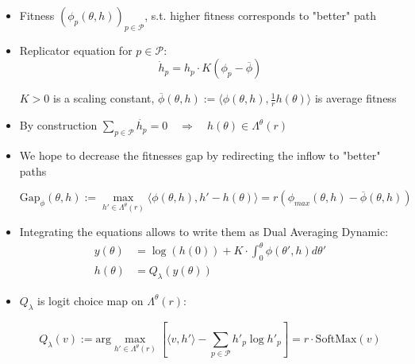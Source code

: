 \documentclass[10pt]{beamer}
\begin{document}
\begin{frame}

\begin{itemize}

\item Fitness  $( \phi_p(\theta, h) )_{p \in \mathcal{P}}$, s.t. higher fitness corresponds to "better" path

\item Replicator equation for $p \in \mathcal{P}$:
$$ \dot{h}_p = h_p \cdot K( \phi_p - \overline{\phi} ) $$

 $K > 0$ is a scaling constant,
 $ \overline{\phi}(\theta, h) := \langle \phi(\theta, h), \frac{1}{r} h(\theta) \rangle$ is average fitness  



\item By construction $\sum_{p \in \mathcal{P}} \dot{h_p} = 0 \quad \Rightarrow \quad h(\theta) \in \Lambda^{\theta}(r)$
 
\item We hope to decrease the fitnesses gap by redirecting the inflow to "better" paths

$$ \mathrm{Gap}_\phi (\theta, h) := \max_{h' \in \Lambda^{\theta}(r) } \langle \phi(\theta, h),  h' - h(\theta) \rangle = r ( \phi_{max}(\theta, h) - \overline{\phi}(\theta, h) )$$

\end{itemize}

\end{frame}

\begin{frame}

\begin{itemize}

 \item Integrating the equations allows to write them as Dual Averaging Dynamic:
\begin{align*} 
 y(\theta) &= \log (h(0)) + K \cdot \int_{0}^{\theta} \phi (\theta', h) d\theta'  \\
 h(\theta) &= Q_{\lambda}(y(\theta)) 
\end{align*}


\item $Q_{\lambda}$ is logit choice map on  $\Lambda^{\theta}(r)$:

$$ Q_{\lambda}(v) := \mathrm{arg}\max_{h' \in \Lambda^{\theta}(r)} \left[ \langle v, h' \rangle - \sum_{p \in \mathcal{P}} h'_{p} \log h'_{p} \right] = r \cdot \mathrm{SoftMax}(v)$$

\end{itemize}

\end{frame}
\end{document}
